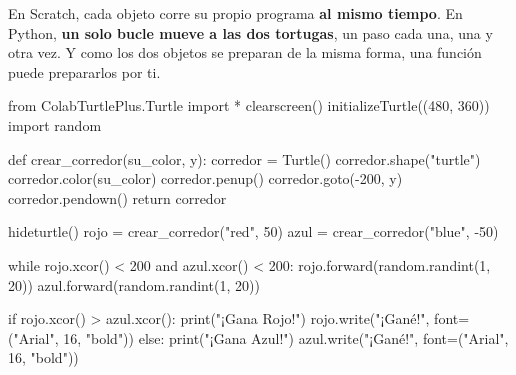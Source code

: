 En Scratch, cada objeto corre su propio programa \textbf{al mismo tiempo}. En Python, \textbf{un solo bucle mueve a las dos tortugas}, un paso cada una, una y otra vez. Y como los dos objetos se preparan de la misma forma, una función puede prepararlos por ti.


\begin{typethis}
from ColabTurtlePlus.Turtle import *
clearscreen()
initializeTurtle((480, 360))
import random

def crear_corredor(su_color, y):
    corredor = Turtle()
    corredor.shape("turtle")
    corredor.color(su_color)
    corredor.penup()
    corredor.goto(-200, y)
    corredor.pendown()
    return corredor

hideturtle()
rojo = crear_corredor("red", 50)
azul = crear_corredor("blue", -50)

while rojo.xcor() < 200 and azul.xcor() < 200:
    rojo.forward(random.randint(1, 20))
    azul.forward(random.randint(1, 20))

if rojo.xcor() > azul.xcor():
    print("¡Gana Rojo!")
    rojo.write("¡Gané!", font=("Arial", 16, "bold"))
else:
    print("¡Gana Azul!")
    azul.write("¡Gané!", font=("Arial", 16, "bold"))
\end{typethis}


